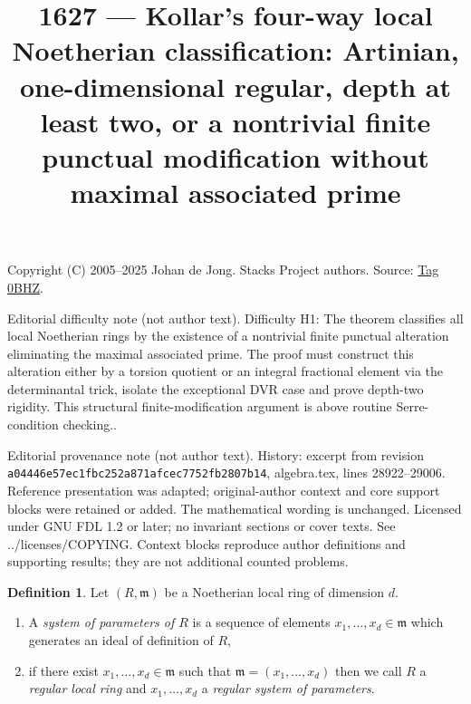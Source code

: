 \documentclass{amsart}
\theoremstyle{plain}
\theoremstyle{definition}
\newtheorem{definition}[subsection]{Definition}
\theoremstyle{remark}
\numberwithin{equation}{subsection}
\begin{document}
\title[Stacks Project, Tag 0BHZ]{1627 --- Kollar\textquoteright{}s four-way local Noetherian classification: Artinian, one-dimensional regular, depth at least two, or a nontrivial finite punctual modification without maximal associated prime}
\maketitle
\noindent Copyright (C) 2005--2025 Johan de Jong. Stacks Project authors. Source: \href{https://stacks.math.columbia.edu/tag/0BHZ}{Tag 0BHZ}.

\noindent Editorial difficulty note (not author text). Difficulty H1: The theorem classifies all local Noetherian rings by the existence of a nontrivial finite punctual alteration eliminating the maximal associated prime. The proof must construct this alteration either by a torsion quotient or an integral fractional element via the determinantal trick, isolate the exceptional DVR case and prove depth-two rigidity. This structural finite-modification argument is above routine Serre-condition checking..

\noindent Editorial provenance note (not author text). History: excerpt from revision \texttt{a0444\allowbreak 6e57e\allowbreak c1fbc\allowbreak 252a8\allowbreak 71afc\allowbreak ec775\allowbreak 2fb28\allowbreak 07b14}, algebra.tex, lines 28922--29006. Reference presentation was adapted; original-author context and core support blocks were retained or added. The mathematical wording is unchanged. Licensed under GNU FDL 1.2 or later; no invariant sections or cover texts. See ../licenses/COPYING. Context blocks reproduce author definitions and supporting results; they are not additional counted problems.

\begin{definition}
\label{definition-regular-local}
Let $(R, \mathfrak m)$ be a Noetherian local ring of dimension $d$.
\begin{enumerate}
\item A {\it system of parameters of $R$} is a sequence of elements
$x_1, \ldots, x_d \in \mathfrak m$ which generates an ideal of
definition of $R$,
\item if there exist $x_1, \ldots, x_d \in \mathfrak m$
such that $\mathfrak m = (x_1, \ldots, x_d)$ then we call
$R$ a {\it regular local ring} and $x_1, \ldots, x_d$ a {\it regular
system of parameters}.
\end{enumerate}
\end{definition}
\end{document}
